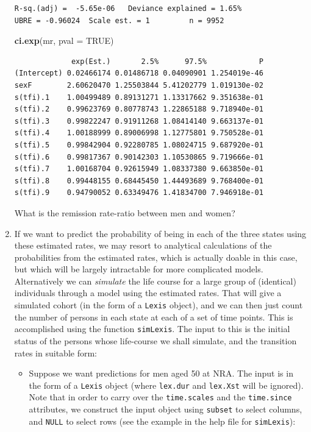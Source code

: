 \documentclass[
]{book}
\newenvironment{Shaded}{\begin{snugshade}}{\end{snugshade}}
\newcommand{\AttributeTok}[1]{\textcolor[rgb]{0.13,0.29,0.53}{#1}}
\newcommand{\ConstantTok}[1]{\textcolor[rgb]{0.56,0.35,0.01}{#1}}
\newcommand{\FunctionTok}[1]{\textcolor[rgb]{0.13,0.29,0.53}{\textbf{#1}}}
\newcommand{\NormalTok}[1]{#1}
\providecommand{\tightlist}{%
  \setlength{\itemsep}{0pt}\setlength{\parskip}{0pt}}
\begin{document}
\begin{enumerate}
\begin{verbatim}
R-sq.(adj) =  -5.65e-06   Deviance explained = 1.65%
UBRE = -0.96024  Scale est. = 1         n = 9952
\end{verbatim}

\begin{Shaded}
\begin{Highlighting}[]
\FunctionTok{ci.exp}\NormalTok{(mr, }\AttributeTok{pval =} \ConstantTok{TRUE}\NormalTok{)}
\end{Highlighting}
\end{Shaded}

\begin{verbatim}
             exp(Est.)       2.5%      97.5%            P
(Intercept) 0.02466174 0.01486718 0.04090901 1.254019e-46
sexF        2.60620470 1.25503844 5.41202779 1.019130e-02
s(tfi).1    1.00499489 0.89131271 1.13317662 9.351638e-01
s(tfi).2    0.99623769 0.80778743 1.22865188 9.718940e-01
s(tfi).3    0.99822247 0.91911268 1.08414140 9.663137e-01
s(tfi).4    1.00188999 0.89006998 1.12775801 9.750528e-01
s(tfi).5    0.99842904 0.92280785 1.08024715 9.687920e-01
s(tfi).6    0.99817367 0.90142303 1.10530865 9.719666e-01
s(tfi).7    1.00168704 0.92615949 1.08337380 9.663850e-01
s(tfi).8    0.99448155 0.68445450 1.44493689 9.768400e-01
s(tfi).9    0.94790052 0.63349476 1.41834700 7.946918e-01
\end{verbatim}

  What is the remission rate-ratio between men and women?
\item
  If we want to predict the probability of being in each of the
  three states using these estimated rates, we may resort to
  analytical calculations of the probabilities from the estimated
  rates, which is actually doable in this case, but which will be largely
  intractable for more complicated models.
  Alternatively we can \emph{simulate} the life course for a large
  group of (identical) individuals through a model using the estimated
  rates. That will give a simulated cohort (in the form of a
  \texttt{Lexis} object), and we can then just count the number of
  persons in each state at each of a set of time points.
  This is accomplished using the function \texttt{simLexis}. The input
  to this is the initial status of the persons whose life-course we
  shall simulate, and the transition rates in suitable form:

  \begin{itemize}
  \tightlist
  \item
    Suppose we want predictions for men aged 50 at
    NRA. The input is in the form of a \texttt{Lexis} object (where
    \texttt{lex.dur} and \texttt{lex.Xst} will be ignored). Note that in
    order to carry over the \texttt{time.scales} and the
    \texttt{time.since} attributes, we construct the input object using
    \texttt{subset} to select columns, and \texttt{NULL} to select rows
    (see the example in the help file for \texttt{simLexis}):
  \end{itemize}


\end{enumerate}
\end{document}
